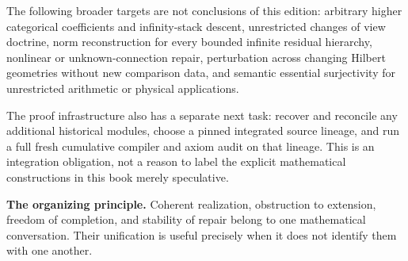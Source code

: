 The following broader targets are not conclusions of this edition: arbitrary higher categorical coefficients and infinity-stack descent, unrestricted changes of view doctrine, norm reconstruction for every bounded infinite residual hierarchy, nonlinear or unknown-connection repair, perturbation across changing Hilbert geometries without new comparison data, and semantic essential surjectivity for unrestricted arithmetic or physical applications.

The proof infrastructure also has a separate next task: recover and reconcile any additional historical modules, choose a pinned integrated source lineage, and run a full fresh cumulative compiler and axiom audit on that lineage. This is an integration obligation, not a reason to label the explicit mathematical constructions in this book merely speculative.

\begin{insight}
\textbf{The organizing principle.} Coherent realization, obstruction to extension, freedom of completion, and stability of repair belong to one mathematical conversation. Their unification is useful precisely when it does not identify them with one another.
\end{insight}
